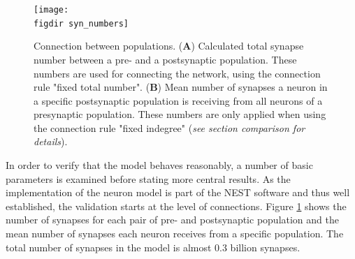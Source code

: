 \begin{figure}[tb]
    \centering
    \texttt{[image: \\figdir syn\_numbers]}
    \caption{
        Connection between populations.
        (\textbf{A}) Calculated total synapse number between a pre- 
        and a postsynaptic population. These numbers are used for connecting the network, 
        using the connection rule "fixed total number". (\textbf{B}) Mean number of synapses
        a neuron in a specific postsynaptic population is receiving from all neurons of a 
        presynaptic population. These numbers are only applied when using the connection
        rule "fixed indegree" (\emph{see section comparison for details}).
    }
    \label{fig:syn_numbers}
\end{figure}
In order to verify that the model behaves reasonably, a number of basic parameters 
is examined before stating more central results. As the implementation of the neuron model
is part of the NEST software and thus well established, the validation starts at the level 
of connections. Figure \ref{fig:syn_numbers} shows the number of synapses for each pair 
of pre- and postsynaptic population and 
the mean number of synapses each neuron receives from a specific population. The total number 
of synapses in the model is almost 0.3 billion synapses.  

